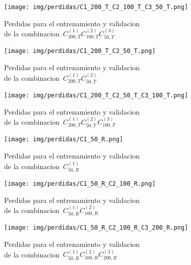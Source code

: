 \begin{figure}[H]
    \centerline{\texttt{[image: img/perdidas/C1\_200\_T\_C2\_100\_T\_C3\_50\_T.png]}}
    \caption{Perdidas para el entrenamiento y validacion\\ de la combinacion~$C^{(1)}_{200,T}C^{(2)}_{100,T}C^{(3)}_{50,T}$}
    \label{fig:C1_200_T_C2_100_T_C3_50_T}
\end{figure}

\begin{figure}[H]
    \centerline{\texttt{[image: img/perdidas/C1\_200\_T\_C2\_50\_T.png]}}
    \caption{Perdidas para el entrenamiento y validacion\\ de la combinacion~$C^{(1)}_{200,T}C^{(2)}_{50,T}$}
    \label{fig:C1_200_T_C2_50_T}
\end{figure}

\begin{figure}[H]
    \centerline{\texttt{[image: img/perdidas/C1\_200\_T\_C2\_50\_T\_C3\_100\_T.png]}}
    \caption{Perdidas para el entrenamiento y validacion\\ de la combinacion~$C^{(1)}_{200,T}C^{(2)}_{50,T}C^{(3)}_{100,T}$}
    \label{fig:C1_200_T_C2_50_T_C3_100_T}
\end{figure}

\begin{figure}[H]
    \centerline{\texttt{[image: img/perdidas/C1\_50\_R.png]}}
    \caption{Perdidas para el entrenamiento y validacion\\ de la combinacion~$C^{(1)}_{50,R}$}
    \label{fig:C1_50_R}
\end{figure}

\begin{figure}[H]
    \centerline{\texttt{[image: img/perdidas/C1\_50\_R\_C2\_100\_R.png]}}
    \caption{Perdidas para el entrenamiento y validacion\\ de la combinacion~$C^{(1)}_{50,R}C^{(2)}_{100,R}$}
    \label{fig:C1_50_R_C2_100_R}
\end{figure}

\begin{figure}[H]
    \centerline{\texttt{[image: img/perdidas/C1\_50\_R\_C2\_100\_R\_C3\_200\_R.png]}}
    \caption{Perdidas para el entrenamiento y validacion\\ de la combinacion~$C^{(1)}_{50,R}C^{(2)}_{100,R}C^{(3)}_{200,R}$}
    \label{fig:C1_50_R_C2_100_R_C3_200_R}
\end{figure}


